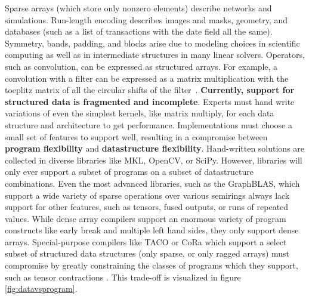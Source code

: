 Sparse arrays (which store only nonzero elements) describe networks and
simulations.
%
Run-length encoding describes images and masks, geometry, and
databases (such as a list of transactions with the date field all the same).
%
Symmetry, bands, padding, and blocks arise due to modeling choices in scientific computing as well as in intermediate structures in many linear solvers.
%
Operators, such as convolution, can be expressed as structured arrays.
%
For example, a convolution with a filter can be expressed as a matrix multiplication
with the toeplitz matrix of all the circular shifts of the filter~\cite{sze2017efficient}.
%
\textbf{Currently, support for structured data is fragmented and incomplete}.
%
Experts must hand write variations of even the simplest kernels, like matrix
multiply, for each data structure and architecture to get performance.
%
Implementations must choose a small set of features to support well, resulting
in a compromise between \textbf{program flexibility} and \textbf{datastructure
flexibility}.
%
Hand-written solutions are collected in diverse libraries like
MKL, OpenCV, or SciPy. 
%
However, libraries will only ever support a subset of
programs on a subset of datastructure combinations. Even the most advanced
libraries, such as the GraphBLAS, which support a wide variety of sparse
operations over various semirings always lack support for other features, such
as tensors, fused outputs, or runs of repeated values. 
%
While dense array
compilers support an enormous variety of program constructs like early break and
multiple left hand sides, they only support dense arrays.  
%
Special-purpose
compilers like TACO or CoRa which support a select subset of structured data
structures (only sparse, or only ragged arrays) must compromise by greatly
constraining the classes of programs which they support, such as tensor
contractions \cite{kjolstad_tensor_2019, fegade_cora_2022}. 
%
This trade-off is
visualized in figure \ref{fig:datavsprogram}.


